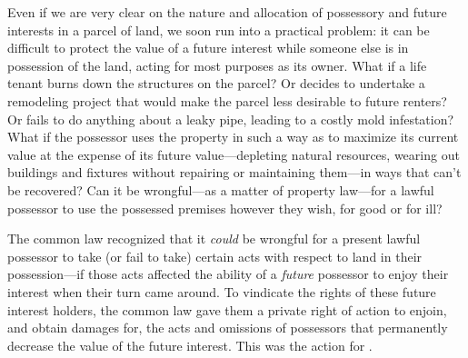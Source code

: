 Even if we are very clear on the nature and allocation of possessory and future
interests in a parcel of land, we soon run into a practical problem: it can be
difficult to protect the value of a future interest while someone else is in
possession of the land, acting for most purposes as its owner. What if a life
tenant burns down the structures on the parcel? Or decides to undertake a
remodeling project that would make the parcel less desirable to future renters?
Or fails to do anything about a leaky pipe, leading to a costly mold
infestation? What if the possessor uses the property in such a way as to
maximize its current value at the expense of its future value---depleting
natural resources, wearing out buildings and fixtures without repairing or
maintaining them---in ways that can't be recovered? Can it be wrongful---as a
matter of property law---for a lawful possessor to use the possessed premises
however they wish, for good or for ill?

The common law recognized that it \textit{could} be wrongful for a present
lawful possessor to take (or fail to take) certain acts with respect to land in
their possession---if those acts affected the ability of a \textit{future}
possessor to enjoy their interest when their turn came around. To vindicate the
rights of these future interest holders, the common law gave them a private
right of action to enjoin, and obtain damages for, the acts and omissions of
possessors that permanently decrease the value of the future interest. This was
the action for .


